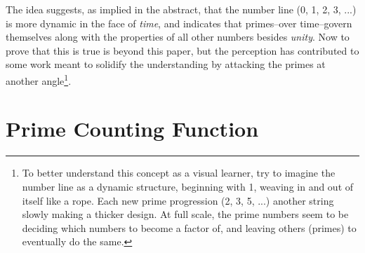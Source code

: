 \documentclass[12pt, letterpaper, twosided]{report}
\begin{document}
The idea suggests, as implied in the abstract, that the number line (0, 1, 2, 3, ...) is more dynamic in the face of \textit{time}, and indicates that primes--over time--govern themselves along with the properties of all other numbers besides \textit{unity}. Now to prove that this is true is beyond this paper, but the perception has contributed to some work meant to solidify the understanding by attacking the primes at another angle\footnote{To better understand this concept as a visual learner, try to imagine the number line as a dynamic structure, beginning with 1, weaving in and out of itself like a rope. Each new prime progression (2, 3, 5, ...) another string slowly making a thicker design. At full scale, the prime numbers seem to be deciding which numbers to become a factor of, and leaving others (primes) to eventually do the same.}.


\section{Prime Counting Function}
\hspace{0.5cm}
\end{document}
